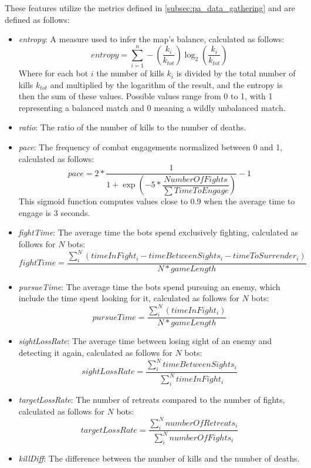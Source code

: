 \documentclass{Configuration_Files/PoliMi3i_thesis}
\begin{document}
These features utilize the metrics defined in \ref{subsec:pa_data_gathering} and are defined as follows:
\begin{itemize}
    \item \textit{entropy}: A measure used to infer the map's balance, calculated as follows:
    \begin{equation}
        entropy = \sum_{i=1}^{n} - \left(\dfrac{k_i}{k_{tot}}\right) \log_2 \left(\dfrac{k_i}{k_{tot}}\right)
    \end{equation}
    Where for each bot $i$ the number of kills $k_i$ is divided by the total number of kills $k_{tot}$ and multiplied by the logarithm of the result, and the entropy is then the sum of these values. Possible values range from 0 to 1, with 1 representing a balanced match and 0 meaning a wildly unbalanced match.
    \item \textit{ratio}: The ratio of the number of kills to the number of deaths.
    \item \textit{pace}: The frequency of combat engagements normalized between 0 and 1, calculated as follows:
    \begin{equation}
        pace = 2 * \dfrac{1}{1 + \exp \left(-5 * \dfrac{NumberOfFights}{\sum TimeToEngage}\right)} - 1
    \end{equation}
    This sigmoid function computes values close to 0.9 when the average time to engage is 3 seconds.
    \item \textit{fightTime}: The average time the bots spend exclusively fighting, calculated as follows for $N$ bots:
    \begin{equation}
        fightTime = \dfrac{  \sum_{i}^{N} \left(timeInFight_i - timeBetweenSights_i - timeToSurrender_i\right) }{ N * gameLength}
    \end{equation}
    \item \textit{pursueTime}: The average time the bots spend pursuing an enemy, which include the time spent looking for it, calculated as follows for $N$ bots:
    \begin{equation}
        pursueTime = \dfrac{  \sum_{i}^{N} \left(timeInFight_i\right) }{ N * gameLength}
    \end{equation}
    \item \textit{sightLossRate}: The average time between losing sight of an enemy and detecting it again, calculated as follows for $N$ bots:
    \begin{equation}
        sightLossRate = \dfrac{  \sum_{i}^{N} timeBetweenSights_i }{ \sum_{i}^{N} timeInFight_i}
    \end{equation}
    \item \textit{targetLossRate}: The number of retreats compared to the number of fights, calculated as follows for $N$ bots:
    \begin{equation}
        targetLossRate = \dfrac{  \sum_{i}^{N} numberOfRetreats_i }{ \sum_{i}^{N} numberOfFights_i}
    \end{equation}
    \item \textit{killDiff}: The difference between the number of kills and the number of deaths.
\end{itemize}
\end{document}
